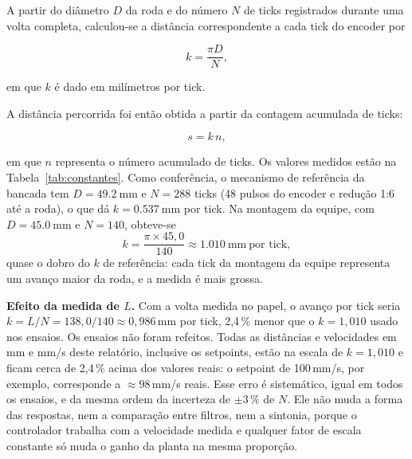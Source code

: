 \documentclass[12pt]{article}
\begin{document}
A partir do diâmetro $D$ da roda e do número $N$ de ticks registrados durante uma volta completa, calculou-se a distância correspondente a cada tick do encoder por

\begin{equation}
    k = \frac{\pi D}{N},
    \label{eq:mm_por_tick}
\end{equation}

em que $k$ é dado em milímetros por tick.

A distância percorrida foi então obtida a partir da contagem acumulada de ticks:

\begin{equation}
    s = k\,n,
    \label{eq:distancia_encoder}
\end{equation}

em que $n$ representa o número acumulado de ticks. Os valores medidos estão na Tabela~\ref{tab:constantes}. Como conferência, o mecanismo de referência da bancada tem $D = \SI{49,2}{\milli\meter}$ e $N = 288$ ticks (48 pulsos do encoder e redução 1:6 até a roda), o que dá $k = \SI{0,537}{\milli\meter}$ por tick. Na montagem da equipe, com $D = \SI{45,0}{\milli\meter}$ e $N = 140$, obteve-se
\begin{equation*}
    k = \frac{\pi \times 45{,}0}{140} \approx \SI{1,010}{\milli\meter}\ \text{por tick},
\end{equation*}
quase o dobro do $k$ de referência: cada tick da montagem da equipe representa um avanço maior da roda, e a medida é mais grossa.

\textbf{Efeito da medida de $L$.}\label{sec:efeito_d} Com a volta medida no papel, o avanço por tick seria $k = L/N = 138{,}0/140 \approx 0{,}986$\,mm por tick, 2,4\,\% menor que o $k = 1{,}010$ usado nos ensaios. Os ensaios não foram refeitos. Todas as distâncias e velocidades em mm e mm/s deste relatório, inclusive os setpoints, estão na escala de $k = 1{,}010$ e ficam cerca de 2,4\,\% acima dos valores reais: o setpoint de 100\,mm/s, por exemplo, corresponde a ${\approx}98$\,mm/s reais. Esse erro é sistemático, igual em todos os ensaios, e da mesma ordem da incerteza de ${\pm}3\,\%$ de $N$. Ele não muda a forma das respostas, nem a comparação entre filtros, nem a sintonia, porque o controlador trabalha com a velocidade medida e qualquer fator de escala constante só muda o ganho da planta na mesma proporção.
\end{document}
